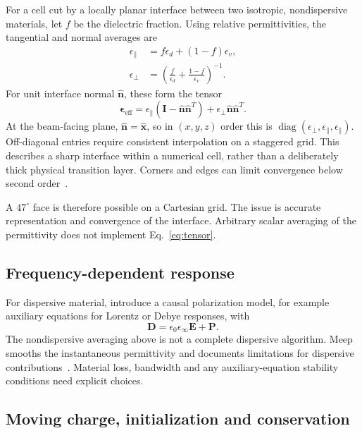 \documentclass[11pt,a4paper]{article}
\numberwithin{equation}{section}
\begin{document}
For a cell cut by a locally planar interface between two isotropic,
nondispersive materials, let \(f\) be the dielectric fraction.
Using relative permittivities, the tangential and normal averages are
\begin{align}
 \epsilon_{\parallel}&=f\epsilon_d+(1-f)\epsilon_v,\\
 \epsilon_{\perp}&=\left(
    \frac{f}{\epsilon_d}+\frac{1-f}{\epsilon_v}
    \right)^{-1}.
\end{align}
For unit interface normal \(\hat{\mathbf n}\), these form the tensor
\begin{equation}
 \boldsymbol{\epsilon}_{\mathrm{eff}}
 =\epsilon_{\parallel}
   (\mathbf I-\hat{\mathbf n}\hat{\mathbf n}^{T})
 +\epsilon_{\perp}\hat{\mathbf n}\hat{\mathbf n}^{T}.
 \label{eq:tensor}
\end{equation}
At the beam-facing plane, \(\hat{\mathbf n}=\hat{\mathbf x}\), so in
\((x,y,z)\) order this is
\(\operatorname{diag}(\epsilon_{\perp},\epsilon_{\parallel},\epsilon_{\parallel})\).
Off-diagonal entries require consistent interpolation on a staggered
grid. This describes a sharp interface within a numerical cell, rather
than a deliberately thick physical transition layer. Corners and edges
can limit convergence below second order~\cite{kottke2008interfaces}.

A \(47^\circ\) face is therefore possible on a Cartesian grid.
The issue is accurate representation and convergence of the interface.
Arbitrary scalar averaging of the permittivity does not implement
Eq.~\eqref{eq:tensor}.

\subsection{Frequency-dependent response}

For dispersive material, introduce a causal polarization model, for example
auxiliary equations for Lorentz or Debye responses, with
\begin{equation}
 \mathbf D=\epsilon_0\epsilon_\infty\mathbf E+\mathbf P.
\end{equation}
The nondispersive averaging above is not a complete dispersive algorithm.
Meep smooths the instantaneous permittivity and documents limitations
for dispersive contributions~\cite{meepSubpixel}. Material loss, bandwidth
and any auxiliary-equation stability conditions need explicit choices.

\subsection{Moving charge, initialization and conservation}
\label{sec:source-consistency}
\end{document}
